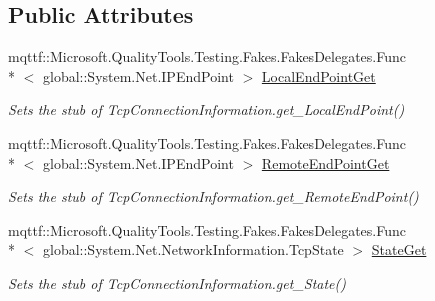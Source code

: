 \subsection*{Public Attributes}
\begin{DoxyCompactItemize}
\item 
mqttf\-::\-Microsoft.\-Quality\-Tools.\-Testing.\-Fakes.\-Fakes\-Delegates.\-Func\\*
$<$ global\-::\-System.\-Net.\-I\-P\-End\-Point $>$ \hyperlink{class_system_1_1_net_1_1_network_information_1_1_fakes_1_1_stub_tcp_connection_information_aacc1ae64e1055223910e0f48780cfaac}{Local\-End\-Point\-Get}
\begin{DoxyCompactList}\small\item\em Sets the stub of Tcp\-Connection\-Information.\-get\-\_\-\-Local\-End\-Point()\end{DoxyCompactList}\item 
mqttf\-::\-Microsoft.\-Quality\-Tools.\-Testing.\-Fakes.\-Fakes\-Delegates.\-Func\\*
$<$ global\-::\-System.\-Net.\-I\-P\-End\-Point $>$ \hyperlink{class_system_1_1_net_1_1_network_information_1_1_fakes_1_1_stub_tcp_connection_information_a00b0d4e5ff1638bf3fde8c4979b69d50}{Remote\-End\-Point\-Get}
\begin{DoxyCompactList}\small\item\em Sets the stub of Tcp\-Connection\-Information.\-get\-\_\-\-Remote\-End\-Point()\end{DoxyCompactList}\item 
mqttf\-::\-Microsoft.\-Quality\-Tools.\-Testing.\-Fakes.\-Fakes\-Delegates.\-Func\\*
$<$ global\-::\-System.\-Net.\-Network\-Information.\-Tcp\-State $>$ \hyperlink{class_system_1_1_net_1_1_network_information_1_1_fakes_1_1_stub_tcp_connection_information_af19a59ebf73bf81528dd07388724eb22}{State\-Get}
\begin{DoxyCompactList}\small\item\em Sets the stub of Tcp\-Connection\-Information.\-get\-\_\-\-State()\end{DoxyCompactList}\end{DoxyCompactItemize}
